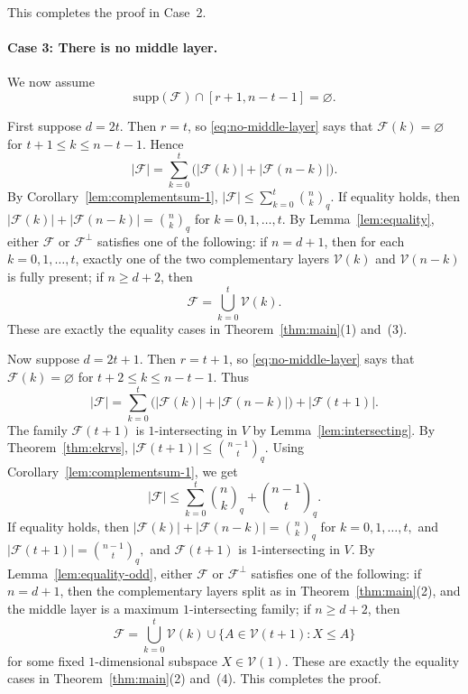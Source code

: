 \documentclass[11pt]{article}
\theoremstyle{definition}
\newcommand{\qbinom}[2]{\genfrac{(}{)}{0pt}{}{#1}{#2}_q}
\newcommand{\supp}{\mathrm{supp}}
\begin{document}
This completes the proof in Case~2.

\paragraph{Case 3: There is no middle layer.}

We now assume
\begin{equation}\label{eq:no-middle-layer}
\supp(\mathcal F)\cap [r+1,n-t-1]=\varnothing.
\end{equation}

First suppose $d=2t$. 
Then $r=t$, so \eqref{eq:no-middle-layer} says that
\(
\mathcal F(k)=\varnothing\)
for \(t+1\le k\le n-t-1.\)
Hence
\[
|\mathcal F|
=
\sum_{k=0}^{t}
\bigl(|\mathcal F(k)|+|\mathcal F(n-k)|\bigr).
\]
By Corollary~\ref{lem:complementsum-1},
\(
|\mathcal F|
\le
\sum_{k=0}^{t}\qbinom{n}{k}.
\)
If equality holds, then
\(
|\mathcal F(k)|+|\mathcal F(n-k)|=\qbinom{n}{k}\)
for \(k=0,1,\ldots,t.\)
By Lemma~\ref{lem:equality}, either $\mathcal F$ or $\mathcal F^\perp$ satisfies one of the following:
if $n=d+1$, then for each $k=0,1,\ldots,t$, exactly one of the two complementary layers $\mathcal V(k)$ and $\mathcal V(n-k)$ is fully present; if $n\ge d+2$, then
\[
\mathcal F=\bigcup_{k=0}^{t}\mathcal V(k).
\]
These are exactly the equality cases in Theorem~\ref{thm:main}(1) and~(3).

Now suppose $d=2t+1$. 
Then $r=t+1$, so \eqref{eq:no-middle-layer} says that
\(
\mathcal F(k)=\varnothing\)
for \(t+2\le k\le n-t-1.\)
Thus
\[
|\mathcal F|
=
\sum_{k=0}^{t}
\bigl(|\mathcal F(k)|+|\mathcal F(n-k)|\bigr)
+
|\mathcal F(t+1)|.
\]
The family $\mathcal F(t+1)$ is $1$-intersecting in $V$ by Lemma~\ref{lem:intersecting}. 
By Theorem~\ref{thm:ekrvs},
\(
|\mathcal F(t+1)|\le \qbinom{n-1}{t}.
\)
Using Corollary~\ref{lem:complementsum-1}, we get
\[
|\mathcal F|
\le
\sum_{k=0}^{t}\qbinom{n}{k}
+
\qbinom{n-1}{t}.
\]
If equality holds, then
\(
|\mathcal F(k)|+|\mathcal F(n-k)|=\qbinom{n}{k}\)
for \(k=0,1,\ldots,t,\)
and
\(
|\mathcal F(t+1)|=\qbinom{n-1}{t},\) and
\(
\mathcal F(t+1)\) is \(1\)-intersecting in \(V.
\)
By Lemma~\ref{lem:equality-odd}, either $\mathcal F$ or $\mathcal F^\perp$ satisfies one of the following:
if $n=d+1$, then the complementary layers split as in Theorem~\ref{thm:main}(2), and the middle layer is a maximum $1$-intersecting family; if $n\ge d+2$, then
\[
\mathcal F
=
\bigcup_{k=0}^{t}\mathcal V(k)
\cup
\{A\in\mathcal V(t+1):X \le A\}
\]
for some fixed $1$-dimensional subspace $X \in \mathcal{V}(1)$. 
These are exactly the equality cases in Theorem~\ref{thm:main}(2) and~(4). This completes the proof.
\end{document}
